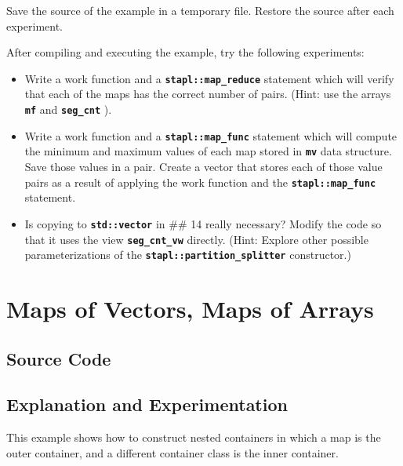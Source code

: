 \documentclass{report}
\begin{document}
Save the source of the example in a temporary file.
Restore the source after each experiment.

After compiling and executing the example, try the following experiments:
\begin{itemize}
\item
Write a work function and a
\texttt{{\bf stapl::map\_reduce}}
statement which will verify that each of the maps has the correct number
of pairs.  (Hint: use the arrays
\texttt{{\bf mf}} and \texttt{{\bf seg\_cnt}} ).

\item
Write a work function and a
\texttt{{\bf stapl::map\_func}}
statement which will compute the minimum and maximum values of each map
stored in
\texttt{{\bf mv}}
data structure.  Save those values in a pair.
Create a vector that stores each of those value pairs as a result of
applying the work function and the
\texttt{{\bf stapl::map\_func}}
statement.

\item 
Is copying to \texttt{{\bf std::vector}} in \#\# 14 really necessary? 
Modify the code so that it uses the view \texttt{{\bf seg\_cnt\_vw}} 
directly. (Hint: Explore other possible parameterizations of the 
\texttt{{\bf stapl::partition\_splitter}} constructor.)

\end{itemize}


\pagebreak
\section{Maps of Vectors, Maps of Arrays}

\subsection{Source Code}



\subsection{Explanation and Experimentation}

This example shows how to construct nested containers in which a map is
the outer container, and a different container class is the inner container.
\end{document}
